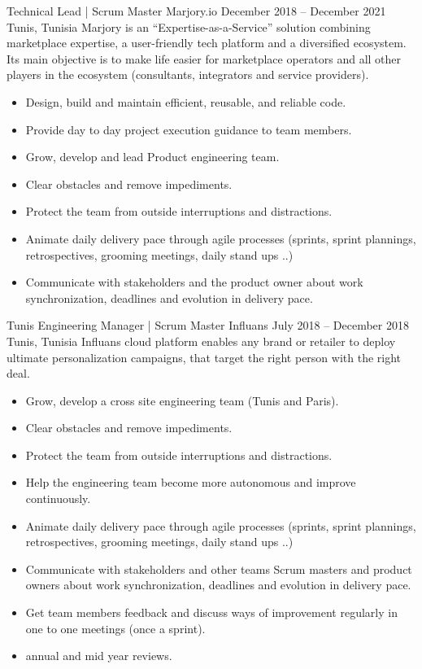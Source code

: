 \documentclass[10pt,a4paper]{resume-settings}
\begin{document}
\cvevent
    {Technical Lead | Scrum Master}
    {Marjory.io}
    {December 2018 -- December 2021}
    {Tunis, Tunisia}
    {Marjory is an “Expertise-as-a-Service” solution combining marketplace expertise, a user-friendly tech platform and a diversified ecosystem. Its main objective is to make life easier for marketplace operators and all other players in the ecosystem (consultants, integrators and service providers).}
    \begin{itemize}
        \item Design, build and maintain efficient, reusable, and reliable code.
        \item Provide day to day project execution guidance to team members.
        \item Grow, develop and lead Product engineering team.
        \item Clear obstacles and remove impediments.
        \item Protect the team from outside interruptions and distractions.
        \item Animate daily delivery pace through agile processes (sprints, sprint plannings, retrospectives, grooming meetings, daily stand ups ..)
        \item Communicate with stakeholders and the product owner about work synchronization, deadlines and evolution in delivery pace.
    \end{itemize}
\divider

\clearpage


\cvevent
    {Tunis Engineering Manager | Scrum Master}
    {Influans}
    {July 2018 -- December 2018}
    {Tunis, Tunisia}
    {Influans cloud platform enables any brand or retailer to deploy ultimate personalization campaigns, that target the right person with the right deal.}
    \begin{itemize}
         \item Grow, develop a cross site engineering team (Tunis and Paris).
        \item Clear obstacles and remove impediments.
        \item Protect the team from outside interruptions and distractions.
        \item Help the engineering team become more autonomous and improve continuously.
        \item Animate daily delivery pace through agile processes (sprints, sprint plannings, retrospectives, grooming meetings, daily stand ups ..)
        \item Communicate with stakeholders and other teams Scrum masters and product owners about work synchronization, deadlines and evolution in delivery pace.
        \item Get team members feedback and discuss ways of improvement regularly in one to one meetings (once a sprint).
        \item annual and mid year reviews.
    \end{itemize}
\divider
\end{document}

